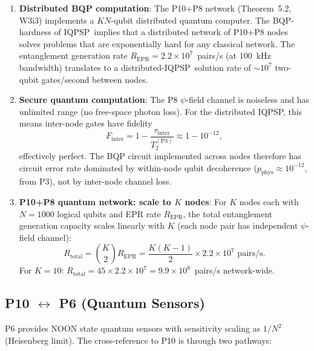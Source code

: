 \documentclass[11pt]{article}
\theoremstyle{definition}
\theoremstyle{remark}
\newcommand{\IQPSP}{\textsc{IQPSP}}
\begin{document}
\begin{enumerate}
\item \textbf{Distributed BQP computation}: The P10+P8 network
  (Theorem~5.2, W3i3) implements a $KN$-qubit distributed quantum computer.
  The BQP-hardness of \IQPSP\ implies that a distributed network of
  P10+P8 nodes solves problems that are exponentially hard for any
  classical network. The entanglement generation rate
  $R_{\mathrm{EPR}} = 2.2\times10^7$~pairs/s (at 100~kHz bandwidth)
  translates to a distributed-\IQPSP\ solution rate of
  $\sim 10^7$ two-qubit gates/second between nodes.

\item \textbf{Secure quantum computation}: The P8 $\psi$-field channel
  is noiseless and has unlimited range (no free-space photon loss).
  For the distributed IQPSP, this means inter-node gates have fidelity
  \begin{equation}
  F_{\mathrm{inter}} = 1 - \frac{\tau_{\mathrm{inter}}}{T_2^{(\mathrm{P3})}}
  \approx 1 - 10^{-12},
  \label{eq:fidelity_inter}
  \end{equation}
  effectively perfect. The BQP circuit implemented across nodes
  therefore has circuit error rate dominated by within-node qubit
  decoherence ($p_{\mathrm{phys}} \approx 10^{-12}$, from P3),
  not by inter-node channel loss.

\item \textbf{P10+P8 quantum network: scale to $K$ nodes}:
  For $K$ nodes each with $N = 1000$ logical qubits and EPR rate
  $R_{\mathrm{EPR}}$, the total entanglement generation capacity scales
  linearly with $K$ (each node pair has independent $\psi$-field channel):
  \begin{equation}
  R_{\mathrm{total}} = \binom{K}{2} R_{\mathrm{EPR}} = \frac{K(K-1)}{2}
  \times 2.2\times10^7 \text{ pairs/s}.
  \label{eq:r_total}
  \end{equation}
  For $K = 10$: $R_{\mathrm{total}} = 45\times2.2\times10^7
  = 9.9\times10^8$~pairs/s network-wide.
\end{enumerate}

\subsection{P10 $\leftrightarrow$ P6 (Quantum Sensors)}
\label{sec:p10_p6}

P6 provides NOON state quantum sensors with sensitivity scaling as $1/N^2$
(Heisenberg limit). The cross-reference to P10 is through two pathways:
\end{document}

